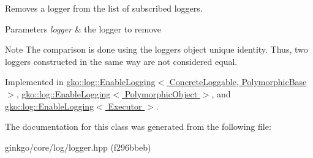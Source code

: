 Removes a logger from the list of subscribed loggers. 


\begin{DoxyParams}{Parameters}
{\em logger} & the logger to remove\\
\hline
\end{DoxyParams}
\begin{DoxyNote}{Note}
The comparison is done using the logger\textquotesingle{}s object unique identity. Thus, two loggers constructed in the same way are not considered equal. 
\end{DoxyNote}


Implemented in \hyperlink{classgko_1_1log_1_1EnableLogging_aba5317f8a03956a61d770e9b07fc65cc}{gko\+::log\+::\+Enable\+Logging$<$ Concrete\+Loggable, Polymorphic\+Base $>$}, \hyperlink{classgko_1_1log_1_1EnableLogging_aba5317f8a03956a61d770e9b07fc65cc}{gko\+::log\+::\+Enable\+Logging$<$ Polymorphic\+Object $>$}, and \hyperlink{classgko_1_1log_1_1EnableLogging_aba5317f8a03956a61d770e9b07fc65cc}{gko\+::log\+::\+Enable\+Logging$<$ Executor $>$}.



The documentation for this class was generated from the following file\+:\begin{DoxyCompactItemize}
\item 
ginkgo/core/log/logger.\+hpp (f296bbeb)\end{DoxyCompactItemize}
